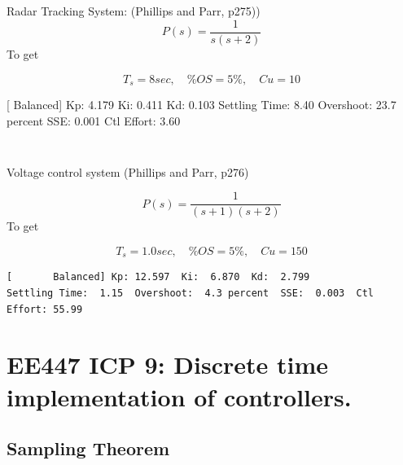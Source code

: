 \documentclass{article}	%
\begin{document}
\subsection{}
Radar Tracking System: (Phillips and Parr, p275))
\[
P(s) = \frac{1}{s(s+2)}
\]
To get

\[
T_s =  8 sec, \quad \%OS = 5\%, \quad Cu = 10
\]

\begin{solution}

[       Balanced] Kp:  4.179  Ki:  0.411  Kd:  0.103
Settling Time:  8.40  Overshoot: 23.7 percent  SSE:  0.001  Ctl Effort:  3.60

 \begin{verbatim}
\end{verbatim}
\end{solution}








\subsection{}
Voltage control system (Phillips and Parr, p276)

\[
P(s) =  \frac {1}{(s+1)(s+2)}
\]
To get

\[
T_s =  1.0 sec, \quad \%OS = 5\%, \quad Cu = 150
\]
\begin{solution}

\begin{verbatim}
[       Balanced] Kp: 12.597  Ki:  6.870  Kd:  2.799
Settling Time:  1.15  Overshoot:  4.3 percent  SSE:  0.003  Ctl Effort: 55.99
\end{verbatim}

\end{solution}





\newpage
\section{EE447 ICP 9: Discrete time implementation of controllers.}


\subsection{Sampling Theorem }
\end{document}
